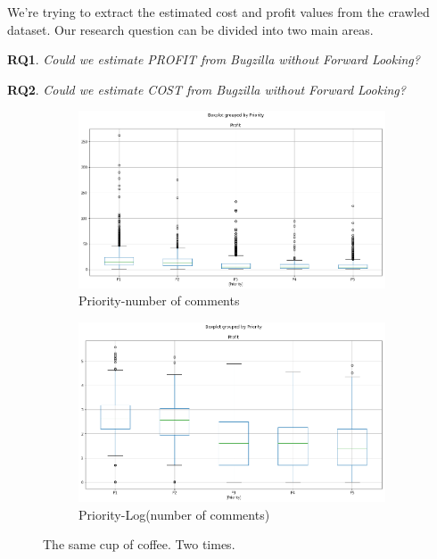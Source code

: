 We're trying to extract the estimated cost and profit values from the crawled dataset. Our research question can be divided into two main areas.

\textbf{RQ1}. \textit{Could we estimate PROFIT from Bugzilla without Forward Looking?}

\textbf{RQ2}. \textit{Could we estimate COST from Bugzilla without Forward Looking?}
\begin{figure}[h]
\centering
  \begin{subfigure}[b]{0.45\linewidth}
    \includegraphics[width=\linewidth]{images/boxplotraw.png}
    \caption{Priority-number of comments}
  \end{subfigure}
  \begin{subfigure}[b]{0.45\linewidth}
    \includegraphics[width=\linewidth]{images/boxplot.png}
    \caption{Priority-Log(number of comments)}
  \end{subfigure}
  \caption{The same cup of coffee. Two times.}
  \label{fig:priority_comments}
\end{figure}
